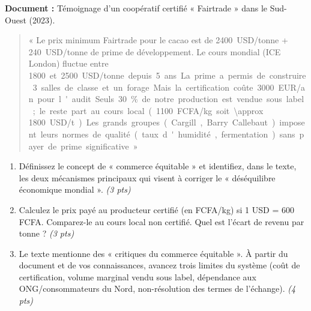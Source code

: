 \documentclass[11pt]{article}
\begin{document}
\begin{exercice}
\textbf{Document :} Témoignage d'un coopératif certifié « Fairtrade » dans le Sud-Ouest (2023).
\begin{quote}
« Le prix minimum Fairtrade pour le cacao est de \SI{2400}{USD/tonne} + \SI{240}{USD/tonne} de prime de développement. Le cours mondial (ICE London) fluctue entre \SI{1800} et \SI{2500}{USD/tonne} depuis 5 ans. La prime a permis de construire 3 salles de classe et un forage. Mais la certification coûte \SI{3000}{EUR/an} pour l'audit. Seuls 30\% de notre production est vendue sous label ; le reste part au cours local (\SI{1100}{FCFA/kg} soit \SI{\approx 1800}{USD/t}). Les grands groupes (Cargill, Barry Callebaut) imposent leurs normes de qualité (taux d'humidité, fermentation) sans payer de prime significative. »
\end{quote}

\begin{enumerate}
\item Définissez le concept de « commerce équitable » et identifiez, dans le texte, les deux mécanismes principaux qui visent à corriger le « déséquilibre économique mondial ». \textit{(3 pts)}
\item Calculez le prix payé au producteur certifié (en FCFA/kg) si 1 USD = 600 FCFA. Comparez-le au cours local non certifié. Quel est l'écart de revenu par tonne ? \textit{(3 pts)}
\item Le texte mentionne des « critiques du commerce équitable ». À partir du document et de vos connaissances, avancez trois limites du système (coût de certification, volume marginal vendu sous label, dépendance aux ONG/consommateurs du Nord, non-résolution des termes de l'échange). \textit{(4 pts)}
\end{enumerate}
\end{exercice}
\end{document}
